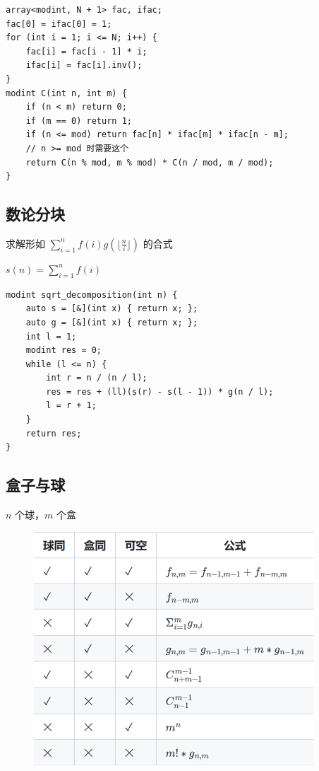 \documentclass[UTF8]{ctexart}
\begin{document}
\begin{sloppypar}
\begin{lstlisting}[style=cpp]
array<modint, N + 1> fac, ifac;
fac[0] = ifac[0] = 1;
for (int i = 1; i <= N; i++) {
    fac[i] = fac[i - 1] * i;
    ifac[i] = fac[i].inv();
}
modint C(int n, int m) {
    if (n < m) return 0;
    if (m == 0) return 1;
    if (n <= mod) return fac[n] * ifac[m] * ifac[n - m];
    // n >= mod 时需要这个
    return C(n % mod, m % mod) * C(n / mod, m / mod);
}
\end{lstlisting}

\subsection{数论分块}

求解形如 $\sum_{i=1}^{n}f(i)g(\lfloor\frac{n}{i}\rfloor)$ 的合式

$s(n) = \sum_{i=1}^{n}f(i)$

\begin{lstlisting}[style=cpp]
modint sqrt_decomposition(int n) {
    auto s = [&](int x) { return x; };
    auto g = [&](int x) { return x; };
    int l = 1;
    modint res = 0;
    while (l <= n) {
        int r = n / (n / l);
        res = res + (ll)(s(r) - s(l - 1)) * g(n / l);
        l = r + 1;
    }
    return res;
}
\end{lstlisting}

\subsection{盒子与球}

$n$ 个球，$m$ 个盒

\begin{figure}[H]
    \flushleft
    \includegraphics[]{box-and-ball.png}
    \label{fig:left}
\end{figure}


\end{sloppypar}
\end{document}
